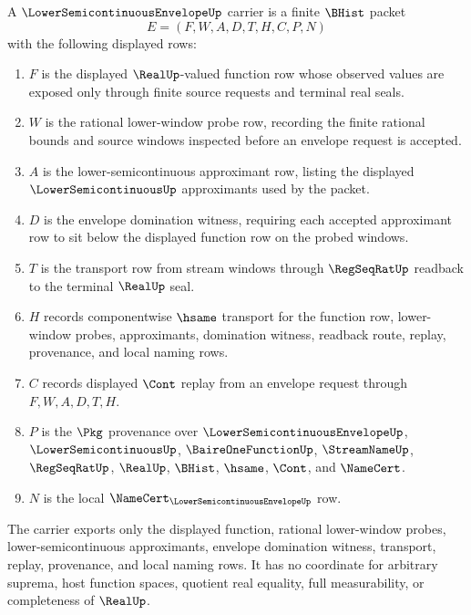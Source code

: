 \begin{definition}
\label{def:lower-semicontinuous-envelope-carrier}
A $\LowerSemicontinuousEnvelopeUp$ carrier is a finite $\BHist$ packet
$$
E=(F,W,A,D,T,H,C,P,N)
$$
with the following displayed rows:
\begin{enumerate}
\item $F$ is the displayed $\RealUp$-valued function row whose observed values are exposed only through finite source requests and terminal real seals.
\item $W$ is the rational lower-window probe row, recording the finite rational bounds and source windows inspected before an envelope request is accepted.
\item $A$ is the lower-semicontinuous approximant row, listing the displayed $\LowerSemicontinuousUp$ approximants used by the packet.
\item $D$ is the envelope domination witness, requiring each accepted approximant row to sit below the displayed function row on the probed windows.
\item $T$ is the transport row from stream windows through $\RegSeqRatUp$ readback to the terminal $\RealUp$ seal.
\item $H$ records componentwise $\hsame$ transport for the function row, lower-window probes, approximants, domination witness, readback route, replay, provenance, and local naming rows.
\item $C$ records displayed $\Cont$ replay from an envelope request through $F,W,A,D,T,H$.
\item $P$ is the $\Pkg$ provenance over $\LowerSemicontinuousEnvelopeUp$, $\LowerSemicontinuousUp$, $\BaireOneFunctionUp$, $\StreamNameUp$, $\RegSeqRatUp$, $\RealUp$, $\BHist$, $\hsame$, $\Cont$, and $\NameCert$.
\item $N$ is the local $\NameCert_{\LowerSemicontinuousEnvelopeUp}$ row.
\end{enumerate}
The carrier exports only the displayed function, rational lower-window probes, lower-semicontinuous approximants, envelope domination witness, transport, replay, provenance, and local naming rows. It has no coordinate for arbitrary suprema, host function spaces, quotient real equality, full measurability, or completeness of $\RealUp$.
\end{definition}

